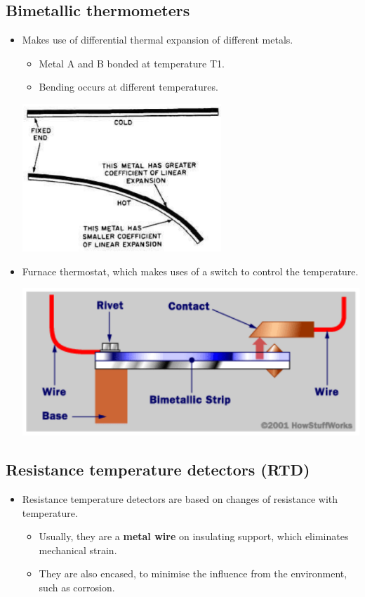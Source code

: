 \documentclass[11pt]{article}
\begin{document}
\subsection{Bimetallic thermometers}
\label{sec:orgd0cd2c8}
\begin{itemize}
\item Makes use of differential thermal expansion of different metals.
\begin{itemize}
\item Metal A and B bonded at temperature T1.
\item Bending occurs at different temperatures.
\end{itemize}

\begin{center}
\includegraphics[height=15em]{./images/bimetallic-thermometer-working-principle.png}
\end{center}

\item Furnace thermostat, which makes uses of a switch to control the temperature.
\begin{center}
\includegraphics[height=15em]{./images/furnace-thermostat-working-principle.png}
\end{center}
\end{itemize}

 \newpage
\subsection{Resistance temperature detectors (RTD)}
\label{sec:org64820ba}
\begin{itemize}
\item Resistance temperature detectors are based on changes of resistance with temperature.
\begin{itemize}
\item Usually, they are a \textbf{metal wire} on insulating support, which eliminates mechanical strain.
\item They are also encased, to minimise the influence from the environment, such as corrosion.
\end{itemize}
\end{itemize}
\end{document}
